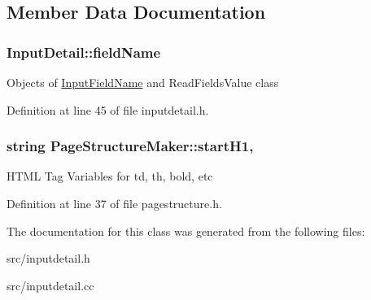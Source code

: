 \subsection{Member Data Documentation}
\hypertarget{classInputDetail_ac6f85380c5152c406d483726382c4798}{
\subsubsection[{field\-Name}]{ Input\-Detail\-::field\-Name\hspace{0.3cm}{\ttfamily [protected]}}}\label{classInputDetail_ac6f85380c5152c406d483726382c4798}
Objects of \hyperlink{classInputFieldName}{Input\-Field\-Name} and Read\-Fields\-Value class 

Definition at line 45 of file inputdetail.\-h.

\hypertarget{classPageStructureMaker_af41d4e21b808f5f8dc2c727f775b6fb2}{
\subsubsection[{start\-H1}]{\setlength{\rightskip}{0pt plus 5cm}string Page\-Structure\-Maker\-::start\-H1\hspace{0.3cm}{\ttfamily [protected]}, {\ttfamily [inherited]}}}\label{classPageStructureMaker_af41d4e21b808f5f8dc2c727f775b6fb2}
H\-T\-M\-L Tag Variables for td, th, bold, etc 

Definition at line 37 of file pagestructure.\-h.



The documentation for this class was generated from the following files\-:\begin{DoxyCompactItemize}
\item 
src/inputdetail.\-h\item 
src/inputdetail.\-cc\end{DoxyCompactItemize}
